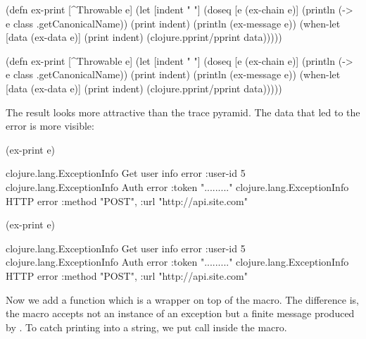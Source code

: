 
\ifnarrow

\begin{clojure}
(defn ex-print
  [^Throwable e]
  (let [indent "  "]
    (doseq [e (ex-chain e)]
      (println (-> e
                   class
                   .getCanonicalName))
      (print indent)
      (println (ex-message e))
      (when-let [data (ex-data e)]
        (print indent)
        (clojure.pprint/pprint data)))))
\end{clojure}

\else

\begin{clojure}
(defn ex-print
  [^Throwable e]
  (let [indent "  "]
    (doseq [e (ex-chain e)]
      (println (-> e class .getCanonicalName))
      (print indent)
      (println (ex-message e))
      (when-let [data (ex-data e)]
        (print indent)
        (clojure.pprint/pprint data)))))
\end{clojure}

\fi

The result looks more attractive than the trace pyramid. The data that led to the error is more visible:

\ifnarrow

\begin{clojure}
(ex-print e)

clojure.lang.ExceptionInfo
  Get user info error
  {:user-id 5}
clojure.lang.ExceptionInfo
  Auth error
  {:token "........."}
clojure.lang.ExceptionInfo
  HTTP error
  {:method "POST",
   :url "http://api.site.com"}
\end{clojure}

\else

\begin{clojure}
(ex-print e)

clojure.lang.ExceptionInfo
  Get user info error
  {:user-id 5}
clojure.lang.ExceptionInfo
  Auth error
  {:token "........."}
clojure.lang.ExceptionInfo
  HTTP error
  {:method "POST", :url "http://api.site.com"}
\end{clojure}

\fi


Now we add a  function which is a wrapper on top of the  macro. The difference is, the macro accepts not an instance of an exception but a finite message produced by . To catch printing into a string, we put  call inside the  macro.

